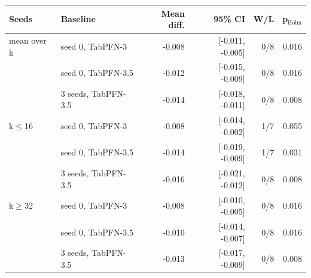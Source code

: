 \begin{tabular}{llrrrr}
\toprule
Seeds & Baseline & Mean diff. & 95\% CI & W/L & p$_{\text{Holm}}$ \\
\midrule
mean over k & seed 0, TabPFN-3 & -0.008 & [-0.011, -0.005] & 0/8 & 0.016 \\
 & seed 0, TabPFN-3.5 & -0.012 & [-0.015, -0.009] & 0/8 & 0.016 \\
 & 3 seeds, TabPFN-3.5 & -0.014 & [-0.018, -0.011] & 0/8 & 0.008 \\
\midrule
k$\leq$16 & seed 0, TabPFN-3 & -0.008 & [-0.014, -0.002] & 1/7 & 0.055 \\
 & seed 0, TabPFN-3.5 & -0.014 & [-0.019, -0.009] & 1/7 & 0.031 \\
 & 3 seeds, TabPFN-3.5 & -0.016 & [-0.021, -0.012] & 0/8 & 0.008 \\
\midrule
k$\geq$32 & seed 0, TabPFN-3 & -0.008 & [-0.010, -0.005] & 0/8 & 0.016 \\
 & seed 0, TabPFN-3.5 & -0.010 & [-0.014, -0.007] & 0/8 & 0.016 \\
 & 3 seeds, TabPFN-3.5 & -0.013 & [-0.017, -0.009] & 0/8 & 0.008 \\
\bottomrule
\end{tabular}
